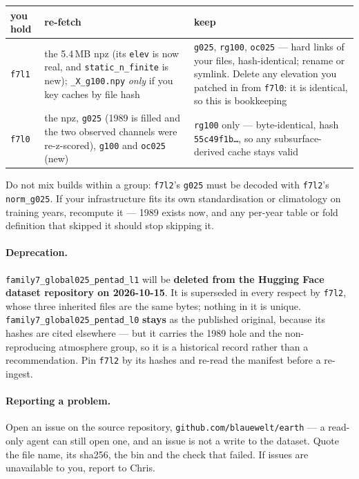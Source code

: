 \documentclass[10pt]{article}
\newcommand{\code}[1]{\texttt{#1}}
\begin{document}
\begin{table}[h]
\centering\setlength{\tabcolsep}{5pt}\footnotesize
\begin{tabular}{@{}>{\raggedright\arraybackslash}p{2.0cm}>{\raggedright\arraybackslash}p{5.9cm}>{\raggedright\arraybackslash}p{6.8cm}@{}}
\toprule
you hold & re-fetch & keep \\
\midrule
\code{f7l1} & the 5.4\,MB npz (its \code{elev} is now real, and
\code{static\_n\_finite} is new); \code{\_X\_g100.npy} \emph{only} if you key
caches by file hash & \code{g025}, \code{rg100}, \code{oc025} --- hard links
of your files, hash-identical; rename or symlink. Delete any elevation you
patched in from \code{f7l0}: it is identical, so this is bookkeeping \\
\addlinespace
\code{f7l0} & the npz, \code{g025} (1989 is filled and the two observed
channels were re-z-scored), \code{g100} and \code{oc025} (new) &
\code{rg100} only --- byte-identical, hash \code{55c49f1b\dots}, so any
subsurface-derived cache stays valid \\
\bottomrule
\end{tabular}
\end{table}

Do not mix builds within a group: \code{f7l2}'s \code{g025} must be decoded
with \code{f7l2}'s \code{norm\_g025}. If your infrastructure fits its own
standardisation or climatology on training years, recompute it --- 1989 exists
now, and any per-year table or fold definition that skipped it should stop
skipping it.

\paragraph{Deprecation.} \code{family7\_global025\_pentad\_l1} will be
\textbf{deleted from the Hugging Face dataset repository on 2026-10-15}. It is
superseded in every respect by \code{f7l2}, whose three inherited files are
the same bytes; nothing in it is unique. \code{family7\_global025\_pentad\_l0}
\textbf{stays} as the published original, because its hashes are cited
elsewhere --- but it carries the 1989 hole and the
non-reproducing atmosphere group, so it is a historical record rather than a
recommendation. Pin \code{f7l2} by its hashes and re-read the manifest before
a re-ingest.

\paragraph{Reporting a problem.} Open an issue on the source repository,
\code{github.com/blauewelt/earth} --- a read-only agent can still open one,
and an issue is not a write to the dataset. Quote the file name, its sha256,
the bin and the check that failed. If issues are unavailable to you, report to
Chris.
\end{document}
